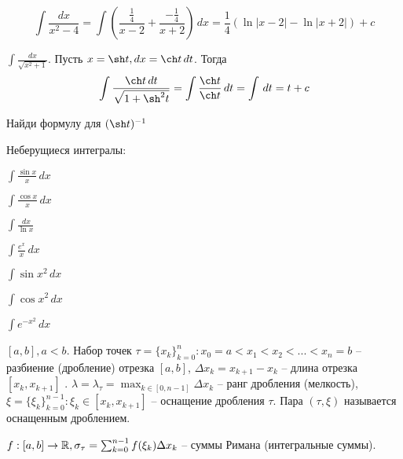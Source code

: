 \begin{Example}[12 и 13 из таблицы]
	\[\int \frac{dx}{x^2 - 4} = \int \left( \frac{\frac{1}{4}}{x - 2} + \frac{-\frac{1}{4}}{x + 2}\right) \,dx = \frac{1}{4} \left(\ln |x - 2| - \ln |x + 2|\right) + c\]	
\end{Example}

\begin{Example}
	$\int \frac{dx}{\sqrt{x^2 + 1}}$. Пусть $x = \sh t, dx = \ch t \,dt $. Тогда
	\[\int \frac{\ch t \,dt}{\sqrt{1 + \sh^2 t}} = \int \frac{\ch t}{\ch t} \,dt = \int \,dt = t + c\]   
\end{Example}

\begin{Ex}
	Найди формулу для $(\sh t)^{-1}$ 
\end{Ex}

Неберущиеся интегралы:

\begin{multicols}{2}
	\begin{MyItemize}
		\item $\int \frac{\sin x}{x} \,dx$ 
		\item $\int \frac{\cos x}{x} \,dx$ 
		\item $\int \frac{\,dx}{\ln x}$ 
		\item $\int \frac{e^x}{x} \,dx$ 
		\item $\int \sin x^2 \,dx$ 
		\item $\int \cos x^2 \,dx$ 
		\item $\int e^{-x^2}\,dx$ 
	\end{MyItemize}
\end{multicols}


\begin{Def}
	$[a, b], a < b$. Набор точек $\tau = \{x_k\}_{k = 0}^n : x_0 = a < x_1 < x_2 < ... < x_n = b$ -- разбиение (дробление) отрезка $[a, b]$, $\Delta x_k = x_{k + 1} - x_k$ -- длина отрезка $[x_k, x_{k + 1}]$ . 
	$\lambda = \lambda_\tau  = \max_{k \in [0, n - 1]} \Delta x_k$ -- ранг дробления (мелкость), $\xi = \{\xi_k\}_{k = 0}^{n - 1} : \xi_k \in [x_k, x_{k + 1}]$ -- оснащение дробления $\tau$.
	Пара $(\tau, \xi)$ называется оснащенным дроблением.  
\end{Def}

\begin{Def}
	$f : [a, b] \to \mathbb{R}, \sigma_\tau = \sum_{k = 0}^{n - 1} f(\xi_k) \Delta x_k$ -- суммы Римана (интегральные суммы). 
\end{Def}

